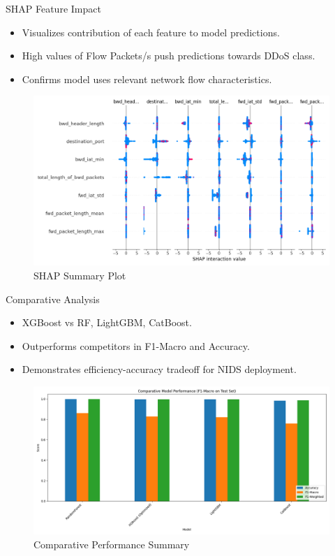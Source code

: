 \documentclass{beamer}
\begin{document}
\begin{frame}{SHAP Feature Impact}
\begin{itemize}
    \item Visualizes contribution of each feature to model predictions.
    \item High values of Flow Packets/s push predictions towards DDoS class.
    \item Confirms model uses relevant network flow characteristics.
\end{itemize}
\begin{figure}
    \includegraphics[width=0.7\linewidth]{assets/figures/results/shap_summary_plot_overall.png}
    \caption{SHAP Summary Plot}
\end{figure}
\end{frame}

\begin{frame}{Comparative Analysis}
\begin{itemize}
    \item XGBoost vs RF, LightGBM, CatBoost.
    \item Outperforms competitors in F1-Macro and Accuracy.
    \item Demonstrates efficiency-accuracy tradeoff for NIDS deployment.
\end{itemize}
\begin{figure}
    \includegraphics[width=0.7\linewidth]{assets/figures/results/comparative_performance_summary.png}
    \caption{Comparative Performance Summary}
\end{figure}
\end{frame}
\end{document}
